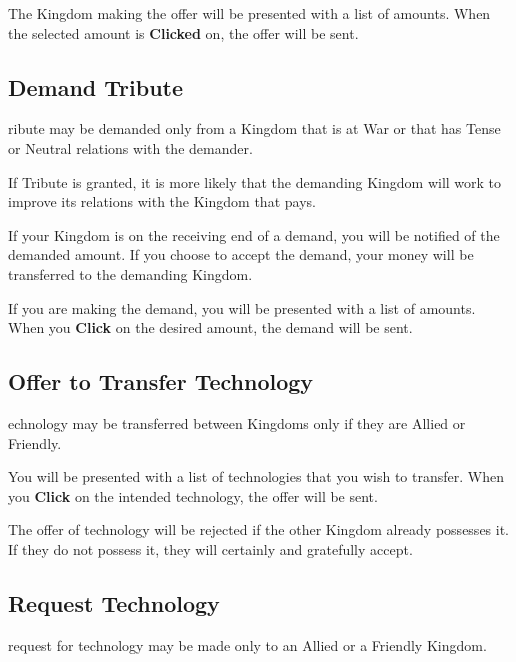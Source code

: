 The Kingdom making the offer will be presented with a list of amounts. When the selected amount is \textbf{Clicked} on, the offer will be sent.

\subsection{\textsf{Demand Tribute}}


ribute may be demanded only from a Kingdom that is at War or that has Tense or Neutral relations with the demander.

If Tribute is granted, it is more likely that the demanding Kingdom will work to improve its relations with the Kingdom that pays.


If your Kingdom is on the receiving end of a demand, you will be notified of the demanded amount. If you choose to accept the demand, your money will be transferred to the demanding Kingdom.

If you are making the demand, you will be presented with a list of amounts. When you \textbf{Click} on the desired amount, the demand will be sent.

\subsection{\textsf{Offer to Transfer Technology}}


echnology may be transferred between Kingdoms only if they are Allied or Friendly.

You will be presented with a list of technologies that you wish to transfer. When you \textbf{Click} on the intended technology, the offer will be sent.

The offer of technology will be rejected if the other Kingdom already possesses it. If they do not possess it, they will certainly and gratefully accept.

\subsection{\textsf{Request Technology}}


 request for technology may be made only to an Allied or a Friendly Kingdom.

